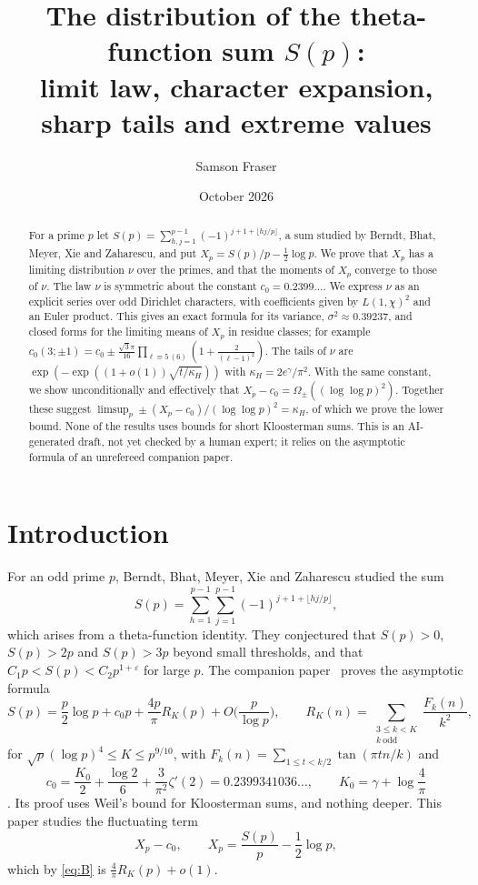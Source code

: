 \documentclass[11pt]{amsart}
\title[The distribution of the theta-function sum $S(p)$]{The distribution of the theta-function sum $S(p)$:\\ limit law, character expansion, sharp tails and extreme values}
\author{Samson Fraser}
\date{October 2026}
\theoremstyle{remark}
\begin{document}
\begin{abstract}
For a prime $p$ let $S(p)=\sum_{h,j=1}^{p-1}(-1)^{j+1+\lfloor hj/p\rfloor}$, a sum studied by Berndt, Bhat, Meyer, Xie and Zaharescu, and put $X_p=S(p)/p-\frac12\log p$. We prove that $X_p$ has a limiting distribution $\nu$ over the primes, and that the moments of $X_p$ converge to those of $\nu$. The law $\nu$ is symmetric about the constant $c_0=0.2399\ldots$. We express $\nu$ as an explicit series over odd Dirichlet characters, with coefficients given by $L(1,\chi)^2$ and an Euler product. This gives an exact formula for its variance, $\sigma^2\approx0.39237$, and closed forms for the limiting means of $X_p$ in residue classes; for example $c_0(3;\pm1)=c_0\pm\frac{\sqrt3\pi}{16}\prod_{\ell\equiv5\,(6)}(1+\frac2{(\ell-1)^2})$. The tails of $\nu$ are $\exp(-\exp((1+o(1))\sqrt{t/\kappa_H}))$ with $\kappa_H=2e^\gamma/\pi^2$. With the same constant, we show unconditionally and effectively that $X_p-c_0=\Omega_\pm((\log\log p)^2)$. Together these suggest $\limsup_p\pm(X_p-c_0)/(\log\log p)^2=\kappa_H$, of which we prove the lower bound. None of the results uses bounds for short Kloosterman sums. This is an AI-generated draft, not yet checked by a human expert; it relies on the asymptotic formula of an unrefereed companion paper.
\end{abstract}

\maketitle

\section{Introduction}

For an odd prime $p$, Berndt, Bhat, Meyer, Xie and Zaharescu \cite{BBMXZ} studied the sum
\[
S(p)=\sum_{h=1}^{p-1}\sum_{j=1}^{p-1}(-1)^{j+1+\lfloor hj/p\rfloor},
\]
which arises from a theta-function identity. They conjectured that $S(p)>0$, $S(p)>2p$ and $S(p)>3p$ beyond small thresholds, and that $C_1p<S(p)<C_2p^{1+\varepsilon}$ for large $p$. The companion paper~\cite{TS} proves the asymptotic formula
\begin{equation}\label{eq:B}
S(p)=\frac p2\log p+c_0p+\frac{4p}\pi R_K(p)+O\Big(\frac p{\log p}\Big),\qquad R_K(n)=\sum_{\substack{3\le k<K\\ k\ \mathrm{odd}}}\frac{F_k(n)}{k^2},
\end{equation}
for $\sqrt p(\log p)^4\le K\le p^{9/10}$, with $F_k(n)=\sum_{1\le t<k/2}\tan(\pi tn/k)$ and
\[
c_0=\frac{K_0}2+\frac{\log2}6+\frac3{\pi^2}\zeta'(2)=0.2399341036\ldots,\qquad K_0=\gamma+\log\frac4\pi
\]
\cite[Theorem~B(ii)]{TS}. Its proof uses Weil's bound for Kloosterman sums, and nothing deeper. This paper studies the fluctuating term
\[
X_p-c_0,\qquad X_p=\frac{S(p)}p-\frac12\log p,
\]
which by \eqref{eq:B} is $\frac4\pi R_K(p)+o(1)$.
\end{document}
